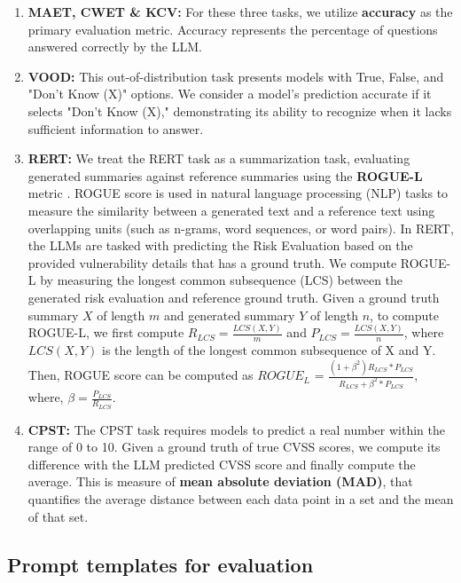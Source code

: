 \documentclass[conference]{IEEEtran}
\begin{document}
\begin{enumerate}[leftmargin=*, noitemsep, topsep=0pt, partopsep=0pt]
\item \textbf{MAET, CWET \& KCV:} For these three tasks, we utilize \textbf{accuracy} as the primary evaluation metric. Accuracy represents the percentage of questions answered correctly by the LLM.

\item \textbf{VOOD:} This out-of-distribution task presents models with True, False, and "Don't Know (X)" options. We consider a model's prediction accurate if it selects "Don't Know (X)," demonstrating its ability to recognize when it lacks sufficient information to answer.

\item \textbf{RERT:} We treat the RERT task as a summarization task, evaluating generated summaries against reference summaries using the \textbf{ROGUE-L} metric \cite{lin-2004-rouge}. ROGUE score is used in natural language processing (NLP) tasks to measure the similarity between a generated text and a reference text using overlapping units (such as n-grams, word sequences, or word pairs). In RERT, the LLMs are tasked with predicting the Risk Evaluation based on the provided vulnerability details that has a ground truth. We compute ROGUE-L by measuring the longest common subsequence (LCS) between the generated risk evaluation and reference ground truth. Given a ground truth summary $X$ of length $m$ and generated summary $Y$ of length $n$, to compute ROGUE-L, we first compute $R_{LCS} = \frac{LCS(X,Y)}{m}$ and $P_{LCS} = \frac{LCS(X,Y)}{n}$, where $LCS(X, Y)$ is the length of the longest common subsequence of X and Y. Then, ROGUE score can be computed as $ROGUE_L$ = $\frac{(1+\beta^2)R_{LCS}*P_{LCS}}{R_{LCS}+\beta^2*P_{LCS}}$, where, $\beta = \frac{P_{LCS}}{R_{LCS}}$.

\item \textbf{CPST:} The CPST task requires models to predict a real number within the range of 0 to 10. Given a ground truth of true CVSS scores, we compute its difference with the LLM predicted CVSS score and finally compute the average. This is measure of \textbf{mean absolute deviation (MAD)}, that quantifies the average distance between each data point in a set and the mean of that set. 
\end{enumerate}

\subsection{Prompt templates for evaluation}\label{appendix:prompt}
\end{document}
